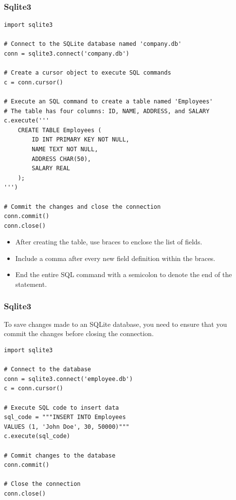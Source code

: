 \subsubsection{Sqlite3}
\begin{codebox}
\begin{verbatim}
import sqlite3

# Connect to the SQLite database named 'company.db'
conn = sqlite3.connect('company.db')

# Create a cursor object to execute SQL commands
c = conn.cursor()

# Execute an SQL command to create a table named 'Employees'
# The table has four columns: ID, NAME, ADDRESS, and SALARY
c.execute('''
    CREATE TABLE Employees (
        ID INT PRIMARY KEY NOT NULL,
        NAME TEXT NOT NULL,
        ADDRESS CHAR(50),
        SALARY REAL
    );
''')

# Commit the changes and close the connection
conn.commit()
conn.close()
\end{verbatim}
\end{codebox}
\begin{itemize}
    \item After creating the table, use braces to enclose the list of fields.
    \item Include a comma after every new field definition within the braces.
    \item End the entire SQL command with a semicolon to denote the end of the statement.
\end{itemize}

\subsubsection{Sqlite3}
To save changes made to an SQLite database, you need to ensure that you commit the changes before closing the connection.
\begin{codebox}
\begin{verbatim}
import sqlite3

# Connect to the database
conn = sqlite3.connect('employee.db')
c = conn.cursor()

# Execute SQL code to insert data
sql_code = """INSERT INTO Employees 
VALUES (1, 'John Doe', 30, 50000)"""
c.execute(sql_code)

# Commit changes to the database
conn.commit()

# Close the connection
conn.close()
\end{verbatim}
\end{codebox}

